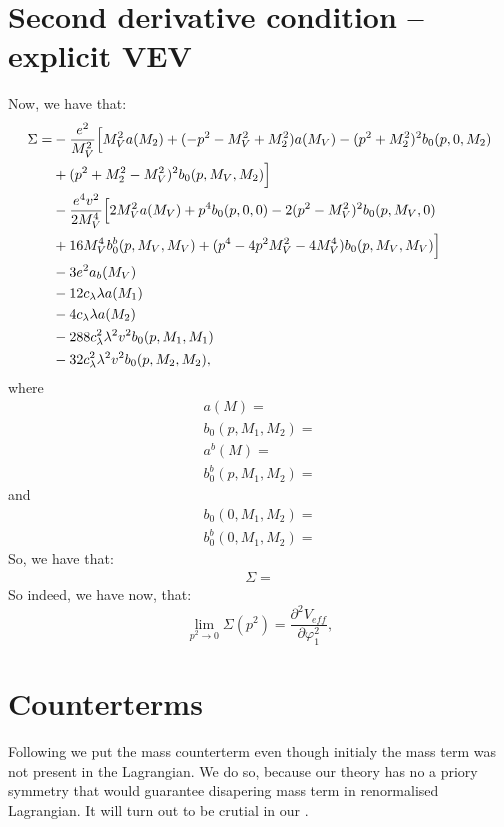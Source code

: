 \section{Second derivative condition -- explicit VEV}\label{sdcworks}
Now, we have that:
\begin{align}
\Sigma = &-\frac{e^2}{M_V^2}\Big[M_V^2a(M_2)+(-p^2-M_V^2+M_2^2)a(M_V)-(p^2+M_2^2)^2b_0(p,0,M_2) 
\notag\\ 
&+(p^2+M_2^2-M_V^2)^2b_0(p,M_V,M_2)\Big] \notag \\
&-\frac{e^4v^2}{2M_V^4}\Big[2M_V^2a(M_V)+p^4b_0(p,0,0)-2(p^2-M_V^2)^2b_0(p,M_V,0)\notag \\
&+16M_V^4b_0^b(p,M_V,M_V)+(p^4-4p^2M_V^2-4M_V^4)b_0(p,M_V,M_V)\Big] \notag \\
&-3e^2a_b(M_V) \notag\\
&-12c_\lambda\lambda a(M_1)\notag \\
&-4c_\lambda\lambda a(M_2)\notag \\
&-288c_\lambda^2\lambda^2v^2b_0(p,M_1,M_1)\notag \\
&-32c_\lambda^2\lambda^2 v^2b_0(p,M_2,M_2),
\end{align}
where
\begin{align}
a(M) = \\
b_0(p,M_1,M_2) = \\
a^b(M) = \\
b_0^b(p,M_1,M_2) = 
\end{align}
and
\begin{align}
b_0(0,M_1,M_2) = \\
b_0^b(0,M_1,M_2) = 
\end{align}
So, we have that:
\begin{align}
\Sigma = 
\end{align}
So indeed, we have now, that:
\begin{equation}\label{second_derivativ_condition}
\lim\limits_{p^2\to 0}\Sigma(p^2)=\frac{\partial^2V_{eff}}{\partial\varphi_1^2},
\end{equation}
\section{Counterterms}
Following \cite{Coleman1973} we put the mass counterterm even though initialy the mass term 
was not present in the Lagrangian. We do so, because our theory has no a priory symmetry 
that would guarantee disapering mass term in renormalised Lagrangian. It will turn out to be 
crutial in our . \\ 

